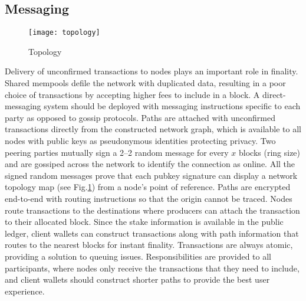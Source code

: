 \documentclass[../Bitcoin Blink.tex]{subfiles}
\begin{document}
\subsection{Messaging}
\begin{figure}[h]
\begin{center}
\texttt{[image: topology]}
\caption{Topology}
\label{topology}
\end{center}
\end{figure}
Delivery of unconfirmed transactions to nodes plays an important role in finality. Shared mempools defile the network with duplicated data, resulting in a poor choice of transactions by accepting higher fees to include in a block. A direct-messaging system should be deployed with messaging instructions specific to each party as opposed to gossip protocols. Paths are attached with unconfirmed transactions directly from the constructed network graph, which is available to all nodes with public keys as pseudonymous identities protecting privacy. Two peering parties mutually sign a 2–2 random message for every $x$ blocks (ring size) and are gossiped across the network to identify the connection as online. All the signed random messages prove that each pubkey signature can display a network topology map (see Fig.\ref{topology}) from a node's point of reference. Paths are encrypted end-to-end with routing \cite{poon2016bitcoin} instructions so that the origin cannot be traced. Nodes route transactions to the destinations where producers can attach the transaction to their allocated block. Since the stake information is available in the public ledger, client wallets can construct transactions along with path information that routes to the nearest blocks for instant finality. Transactions are always atomic, providing a solution to queuing issues. Responsibilities are provided to all participants, where nodes only receive the transactions that they need to include, and client wallets should construct shorter paths to provide the best user experience.
\end{document}
